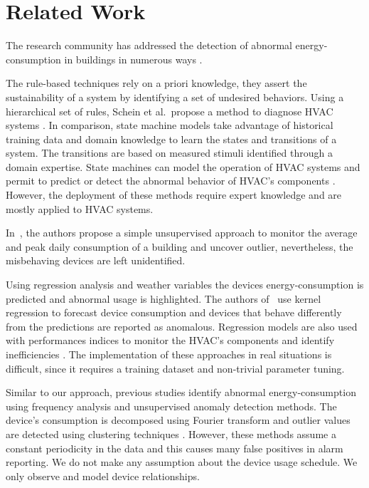 \section{Related Work}

The research community has addressed the detection of abnormal energy-consumption in buildings in numerous ways \cite{katipamula:1review2005,katipamula:2review2005}.
% 

The rule-based techniques rely on a priori knowledge, they assert the sustainability of a system by identifying a set of undesired behaviors.
Using a hierarchical set of rules, Schein et al.\ propose a method to diagnose HVAC systems \cite{schein:hvacr2006}.
In comparison, state machine models take advantage of historical training data and domain knowledge to learn the states and transitions of a system.
The transitions are based on measured stimuli identified through a domain expertise.
State machines can model the operation of HVAC systems \cite{patnaik:toist2011} and permit to predict or detect the abnormal behavior of HVAC's components \cite{bellala:buildsys2012}.
However, the deployment of these methods require expert knowledge and are mostly applied to HVAC systems.

In~\cite{seem:energybldg2007}, the authors propose a simple unsupervised approach to monitor the average and peak daily consumption of a building and uncover outlier, nevertheless, the misbehaving devices are left unidentified.

Using regression analysis and weather variables the devices energy-consumption is predicted and abnormal usage is highlighted.
The authors of~\cite{brown:buildperf2012} use kernel regression to forecast device consumption and devices that behave differently from the predictions are reported as anomalous.
Regression models are also used with performances indices to monitor the HVAC's components and identify inefficiencies \cite{zhou:wiley2009}.
The implementation of these approaches in real situations is difficult, since it requires a training dataset and non-trivial 
parameter tuning.

Similar to our approach, previous studies identify abnormal energy-consumption using frequency analysis and unsupervised anomaly detection methods.
The device's consumption is decomposed using Fourier transform and outlier values are detected using clustering 
techniques \cite{Bellala_buildsys11,wrinch:pes2012,chen:aaaiw2011}. %
However, these methods assume a constant periodicity in the data and this causes many false positives in alarm reporting.  %
We do not make any assumption about the device usage schedule.  We only observe and model device relationships.

